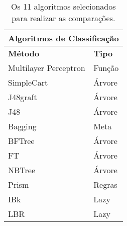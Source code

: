 \begin{table}
  \begin{center}
    \begin{tabular}{ l | l }
      \hline
      \multicolumn{2}{c}{ \bfseries Algoritmos de Classificação} \\ \hline
      \bfseries Método & \bfseries Tipo \\ \hline
      Multilayer Perceptron & Função \\
      SimpleCart & Árvore \\
      J48graft & Árvore \\
      J48 & Árvore \\
      Bagging & Meta \\
      BFTree & Árvore \\
      FT & Árvore \\
      NBTree & Árvore \\
      Prism & Regras \\
      IBk & Lazy \\
      LBR & Lazy \\
      \hline
    \end{tabular}
  \end{center}
  \caption{Os 11 algoritmos selecionados para realizar as comparações.}
  \label{table:algoritmos}
\end{table}


